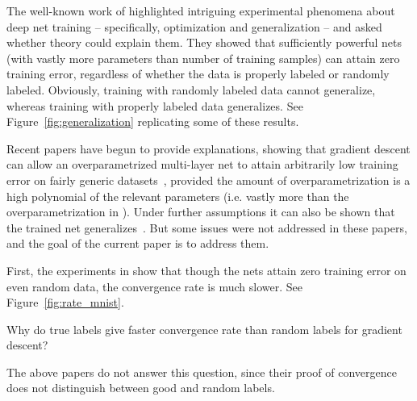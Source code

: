

The well-known work of \citet{zhang2016understanding} highlighted intriguing experimental phenomena about deep net training -- specifically, optimization and generalization -- and asked whether theory could explain them. They showed that sufficiently powerful nets (with vastly more parameters than number of training samples) can attain zero training error, regardless of whether the data is properly labeled or randomly labeled. Obviously, training with randomly labeled data cannot generalize, whereas training with properly labeled data generalizes. See Figure~\ref{fig:generalization} replicating some of these results. 

Recent papers have begun to provide explanations, showing that gradient descent can allow an overparametrized multi-layer  net to attain arbitrarily low training error on fairly generic datasets~\citep{du2018global,du2018provably,li2018learning,allen2018convergence,zou2018stochastic}, provided the amount of overparametrization is a high polynomial of the relevant parameters (i.e. vastly more than the overparametrization in \cite{zhang2016understanding}). Under further assumptions it can also be shown that the trained net generalizes~\citep{allen2018learning}.  But some issues were not addressed in these papers, and the goal of the current paper is to address them. 

First, the experiments in \cite{zhang2016understanding} show that though the nets attain zero training error on even random data, the convergence rate is much slower. See Figure~\ref{fig:rate_mnist}. %
\begin{question}\label{ques:conv}
	Why do true labels give faster convergence rate than random labels for gradient descent?
\end{question}
The above papers do not answer this question, since their proof of convergence does not distinguish between good and random labels.


